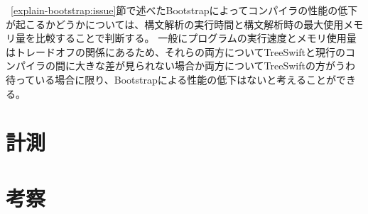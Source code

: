 ~\ref{explain-bootstrap:issue}節で述べたBootstrapによってコンパイラの性能の低下が起こるかどうかについては、構文解析の実行時間と構文解析時の最大使用メモリ量を比較することで判断する。
一般にプログラムの実行速度とメモリ使用量はトレードオフの関係にあるため、それらの両方についてTreeSwiftと現行のコンパイラの間に大きな差が見られない場合か両方についてTreeSwiftの方がうわ待っている場合に限り、Bootstrapによる性能の低下はないと考えることができる。


\section{計測}

\section{考察}

